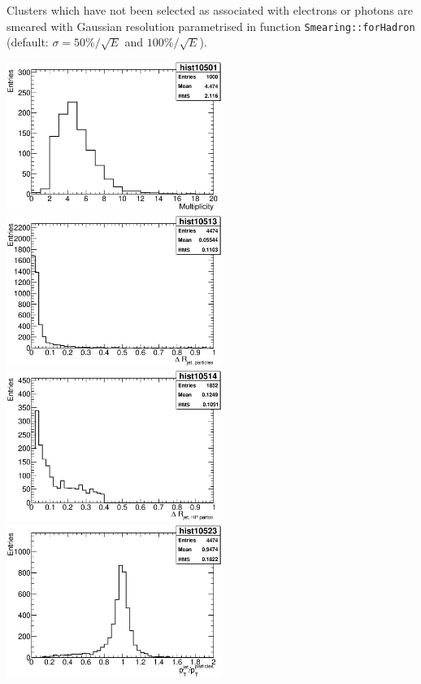 Clusters which have not been selected as associated with electrons or
photons are smeared with Gaussian resolution parametrised in function
{\tt Smearing::forHadron} (default: $\sigma = 50\%/\sqrt{E}$ and $100\%/\sqrt{E}$).
 

\begin{Fighere}
\begin{center}
{
   \includegraphics[width=7.0cm,angle=0]{plot-multiJets.eps}\\
}
{
   \includegraphics[width=7.0cm,angle=0]{plot-dR-jetParticles.eps}
   \includegraphics[width=7.0cm,angle=0]{plot-dR-jetHPparton.eps}\\
}
{
   \includegraphics[width=7.0cm,angle=0]{plot-dPT-jetParticles.eps}
}
\end{center}
\end{Fighere}
